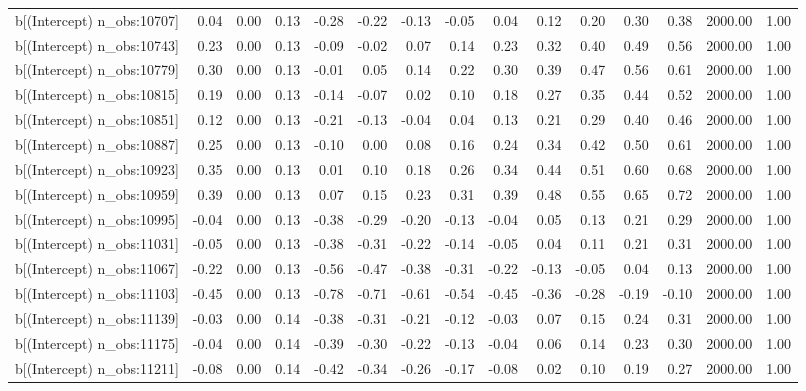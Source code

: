\begin{table}[ht]
\begin{tabular}{rrrrrrrrrrrrrrr}
  b[(Intercept) n\_obs:10707] & 0.04 & 0.00 & 0.13 & -0.28 & -0.22 & -0.13 & -0.05 & 0.04 & 0.12 & 0.20 & 0.30 & 0.38 & 2000.00 & 1.00 \\ 
  b[(Intercept) n\_obs:10743] & 0.23 & 0.00 & 0.13 & -0.09 & -0.02 & 0.07 & 0.14 & 0.23 & 0.32 & 0.40 & 0.49 & 0.56 & 2000.00 & 1.00 \\ 
  b[(Intercept) n\_obs:10779] & 0.30 & 0.00 & 0.13 & -0.01 & 0.05 & 0.14 & 0.22 & 0.30 & 0.39 & 0.47 & 0.56 & 0.61 & 2000.00 & 1.00 \\ 
  b[(Intercept) n\_obs:10815] & 0.19 & 0.00 & 0.13 & -0.14 & -0.07 & 0.02 & 0.10 & 0.18 & 0.27 & 0.35 & 0.44 & 0.52 & 2000.00 & 1.00 \\ 
  b[(Intercept) n\_obs:10851] & 0.12 & 0.00 & 0.13 & -0.21 & -0.13 & -0.04 & 0.04 & 0.13 & 0.21 & 0.29 & 0.40 & 0.46 & 2000.00 & 1.00 \\ 
  b[(Intercept) n\_obs:10887] & 0.25 & 0.00 & 0.13 & -0.10 & 0.00 & 0.08 & 0.16 & 0.24 & 0.34 & 0.42 & 0.50 & 0.61 & 2000.00 & 1.00 \\ 
  b[(Intercept) n\_obs:10923] & 0.35 & 0.00 & 0.13 & 0.01 & 0.10 & 0.18 & 0.26 & 0.34 & 0.44 & 0.51 & 0.60 & 0.68 & 2000.00 & 1.00 \\ 
  b[(Intercept) n\_obs:10959] & 0.39 & 0.00 & 0.13 & 0.07 & 0.15 & 0.23 & 0.31 & 0.39 & 0.48 & 0.55 & 0.65 & 0.72 & 2000.00 & 1.00 \\ 
  b[(Intercept) n\_obs:10995] & -0.04 & 0.00 & 0.13 & -0.38 & -0.29 & -0.20 & -0.13 & -0.04 & 0.05 & 0.13 & 0.21 & 0.29 & 2000.00 & 1.00 \\ 
  b[(Intercept) n\_obs:11031] & -0.05 & 0.00 & 0.13 & -0.38 & -0.31 & -0.22 & -0.14 & -0.05 & 0.04 & 0.11 & 0.21 & 0.31 & 2000.00 & 1.00 \\ 
  b[(Intercept) n\_obs:11067] & -0.22 & 0.00 & 0.13 & -0.56 & -0.47 & -0.38 & -0.31 & -0.22 & -0.13 & -0.05 & 0.04 & 0.13 & 2000.00 & 1.00 \\ 
  b[(Intercept) n\_obs:11103] & -0.45 & 0.00 & 0.13 & -0.78 & -0.71 & -0.61 & -0.54 & -0.45 & -0.36 & -0.28 & -0.19 & -0.10 & 2000.00 & 1.00 \\ 
  b[(Intercept) n\_obs:11139] & -0.03 & 0.00 & 0.14 & -0.38 & -0.31 & -0.21 & -0.12 & -0.03 & 0.07 & 0.15 & 0.24 & 0.31 & 2000.00 & 1.00 \\ 
  b[(Intercept) n\_obs:11175] & -0.04 & 0.00 & 0.14 & -0.39 & -0.30 & -0.22 & -0.13 & -0.04 & 0.06 & 0.14 & 0.23 & 0.30 & 2000.00 & 1.00 \\ 
  b[(Intercept) n\_obs:11211] & -0.08 & 0.00 & 0.14 & -0.42 & -0.34 & -0.26 & -0.17 & -0.08 & 0.02 & 0.10 & 0.19 & 0.27 & 2000.00 & 1.00 \\ 

\end{tabular}
\end{table}
